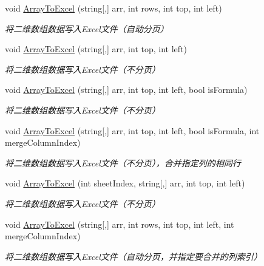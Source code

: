 \begin{DoxyCompactItemize}
void \hyperlink{class_x_c_l_net_tools_1_1_office_1_1_excel_handler_1_1_excel_helper_a030afbe0c22736247a4d56571d511d35}{Array\+To\+Excel} (string\mbox{[},\mbox{]} arr, int rows, int top, int left)
\begin{DoxyCompactList}\small\item\em 将二维数组数据写入\+Excel文件（自动分页） \end{DoxyCompactList}\item 
void \hyperlink{class_x_c_l_net_tools_1_1_office_1_1_excel_handler_1_1_excel_helper_a14572a6f3b54ae9c79abf8bceafdb899}{Array\+To\+Excel} (string\mbox{[},\mbox{]} arr, int top, int left)
\begin{DoxyCompactList}\small\item\em 将二维数组数据写入\+Excel文件（不分页） \end{DoxyCompactList}\item 
void \hyperlink{class_x_c_l_net_tools_1_1_office_1_1_excel_handler_1_1_excel_helper_af7ddc4bd7a68d157487f83a4b4525e96}{Array\+To\+Excel} (string\mbox{[},\mbox{]} arr, int top, int left, bool is\+Formula)
\begin{DoxyCompactList}\small\item\em 将二维数组数据写入\+Excel文件（不分页） \end{DoxyCompactList}\item 
void \hyperlink{class_x_c_l_net_tools_1_1_office_1_1_excel_handler_1_1_excel_helper_ae1ee324469dc2bc11d537cad8a18edab}{Array\+To\+Excel} (string\mbox{[},\mbox{]} arr, int top, int left, bool is\+Formula, int merge\+Column\+Index)
\begin{DoxyCompactList}\small\item\em 将二维数组数据写入\+Excel文件（不分页），合并指定列的相同行 \end{DoxyCompactList}\item 
void \hyperlink{class_x_c_l_net_tools_1_1_office_1_1_excel_handler_1_1_excel_helper_aad9f026e5f7ec6d4307f5755a44030f8}{Array\+To\+Excel} (int sheet\+Index, string\mbox{[},\mbox{]} arr, int top, int left)
\begin{DoxyCompactList}\small\item\em 将二维数组数据写入\+Excel文件（不分页） \end{DoxyCompactList}\item 
void \hyperlink{class_x_c_l_net_tools_1_1_office_1_1_excel_handler_1_1_excel_helper_a6d9aebcdcfc00873fa4ee3cff1b7db5f}{Array\+To\+Excel} (string\mbox{[},\mbox{]} arr, int rows, int top, int left, int merge\+Column\+Index)
\begin{DoxyCompactList}\small\item\em 将二维数组数据写入\+Excel文件（自动分页，并指定要合并的列索引） \end{DoxyCompactList}\item 

\end{DoxyCompactItemize}

